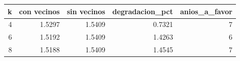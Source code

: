 \begin{tabular}{rrrrr}
\toprule
k & con vecinos & sin vecinos & degradacion\_pct & anios\_a\_favor \\
\midrule
4 & 1.5297 & 1.5409 & 0.7321 & 7 \\
6 & 1.5192 & 1.5409 & 1.4263 & 6 \\
8 & 1.5188 & 1.5409 & 1.4545 & 7 \\
\bottomrule
\end{tabular}

